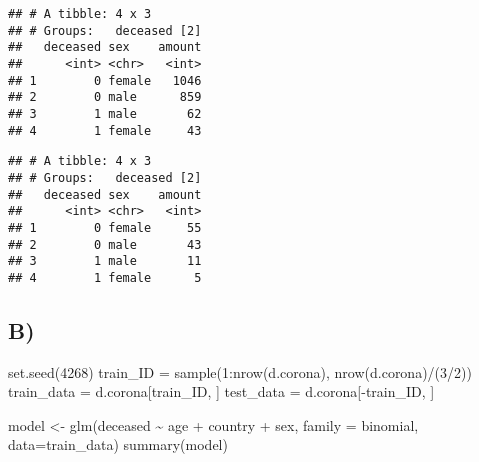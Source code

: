 \documentclass[
]{article}
\newenvironment{Shaded}{\begin{snugshade}}{\end{snugshade}}
\newcommand{\AttributeTok}[1]{\textcolor[rgb]{0.77,0.63,0.00}{#1}}
\newcommand{\CommentTok}[1]{\textcolor[rgb]{0.56,0.35,0.01}{\textit{#1}}}
\newcommand{\DecValTok}[1]{\textcolor[rgb]{0.00,0.00,0.81}{#1}}
\newcommand{\FunctionTok}[1]{\textcolor[rgb]{0.00,0.00,0.00}{#1}}
\newcommand{\NormalTok}[1]{#1}
\newcommand{\OtherTok}[1]{\textcolor[rgb]{0.56,0.35,0.01}{#1}}
\newcommand{\SpecialCharTok}[1]{\textcolor[rgb]{0.00,0.00,0.00}{#1}}
\newcommand{\StringTok}[1]{\textcolor[rgb]{0.31,0.60,0.02}{#1}}
\begin{document}
\begin{verbatim}
## # A tibble: 4 x 3
## # Groups:   deceased [2]
##   deceased sex    amount
##      <int> <chr>   <int>
## 1        0 female   1046
## 2        0 male      859
## 3        1 male       62
## 4        1 female     43
\end{verbatim}

\begin{Shaded}
\end{Shaded}

\begin{verbatim}
## # A tibble: 4 x 3
## # Groups:   deceased [2]
##   deceased sex    amount
##      <int> <chr>   <int>
## 1        0 female     55
## 2        0 male       43
## 3        1 male       11
## 4        1 female      5
\end{verbatim}

\hypertarget{b}{%
\subsection{B)}\label{b}}

\begin{Shaded}
\begin{Highlighting}[]
\FunctionTok{set.seed}\NormalTok{(}\DecValTok{4268}\NormalTok{)}
\NormalTok{train\_ID }\OtherTok{=} \FunctionTok{sample}\NormalTok{(}\DecValTok{1}\SpecialCharTok{:}\FunctionTok{nrow}\NormalTok{(d.corona), }\FunctionTok{nrow}\NormalTok{(d.corona)}\SpecialCharTok{/}\NormalTok{(}\DecValTok{3}\SpecialCharTok{/}\DecValTok{2}\NormalTok{))}
\NormalTok{train\_data }\OtherTok{=}\NormalTok{ d.corona[train\_ID, ]}
\NormalTok{test\_data }\OtherTok{=}\NormalTok{ d.corona[}\SpecialCharTok{{-}}\NormalTok{train\_ID, ]}


\NormalTok{model }\OtherTok{\textless{}{-}} \FunctionTok{glm}\NormalTok{(deceased }\SpecialCharTok{\textasciitilde{}}\NormalTok{ age }\SpecialCharTok{+}\NormalTok{ country }\SpecialCharTok{+}\NormalTok{ sex, }\AttributeTok{family =}\NormalTok{ binomial, }\AttributeTok{data=}\NormalTok{train\_data)}
\FunctionTok{summary}\NormalTok{(model)}
\end{Highlighting}
\end{Shaded}
\end{document}
